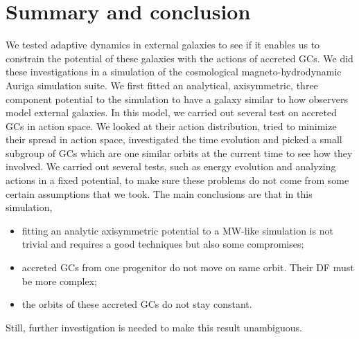 \section{Summary and conclusion}\label{sec:sumconc}
We tested adaptive dynamics in external galaxies to see if it enables us to constrain the potential of these galaxies with the actions of accreted \acp{GC}. We did these investigations in a simulation of the cosmological magneto-hydrodynamic Auriga simulation suite. We first fitted an analytical, axisymmetric, three component potential to the simulation to have a galaxy similar to how observers model external galaxies. In this model, we carried out several test on accreted \acp{GC} in action space. We looked at their action distribution, tried to minimize their spread in action space, investigated the time evolution and picked a small subgroup of \acp{GC} which are one similar orbits at the current time to see how they involved. We carried out several tests, such as energy evolution and analyzing actions in a fixed potential, to make sure these problems do not come from some certain assumptions that we took. The main conclusions are that in this simulation,
\begin{itemize}
    \item fitting an analytic axisymmetric potential to a \ac{MW}-like simulation is not trivial and requires a good techniques but also some compromises;
    \item accreted \acp{GC} from one progenitor do not move on same orbit. Their \ac{DF} must be more complex;
    \item the orbits of these accreted \acp{GC} do not stay constant.
\end{itemize}
Still, further investigation is needed to make this result unambiguous.